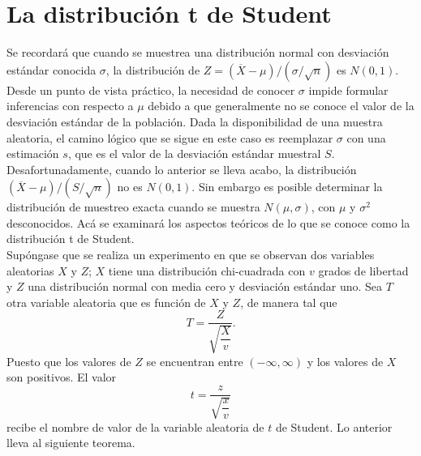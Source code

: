 \section{La distribución t de Student}
Se recordará que cuando se muestrea una distribución normal con desviación estándar conocida $\sigma$, la distribución de $Z=(\overline{X}-\mu)/(\sigma/\sqrt{n})$ es $N(0,1)$. Desde un punto de vista práctico, la necesidad de conocer $\sigma$ impide formular inferencias con respecto a $\mu$ debido a que generalmente no se conoce el valor de la desviación estándar de la población. Dada la disponibilidad de una muestra aleatoria, el camino lógico que se sigue en este caso es reemplazar $\sigma$ con una estimación $s$, que es el valor de la desviación estándar muestral $S$. Desafortunadamente, cuando lo anterior se lleva acabo, la distribución $(\overline{X}-\mu)/(S/\sqrt{n})$ no es $N(0,1)$. Sin embargo es posible determinar la distribución de muestreo exacta cuando se muestra $N(\mu,\sigma)$, con $\mu$ y $\sigma^2$ desconocidos. Acá se examinará los aspectos teóricos de lo que se conoce como la distribución t de Student.\\

Supóngase que se realiza un experimento en que se observan dos variables aleatorias $X$ y $Z$; $X$ tiene una distribución chi-cuadrada con $v$ grados de libertad y $Z$ una distribución normal con media cero y desviación estándar uno. Sea $T$ otra variable aleatoria que es función de $X$ y $Z$, de manera tal que
$$T=\dfrac{Z}{\sqrt{\dfrac{X}{v}}}.$$
Puesto que los valores de $Z$ se encuentran entre $(-\infty,\infty)$ y los valores de $X$ son positivos. El valor
$$t=\dfrac{z}{\sqrt{\dfrac{x}{v}}}$$
recibe el nombre de valor de la variable aleatoria de $t$ de Student. Lo anterior lleva al siguiente teorema.

